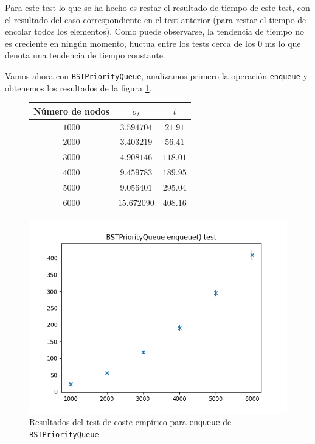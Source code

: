 \documentclass[a4paper, 12pt]{article}
\begin{document}
                Para este test lo que se ha hecho es restar el resultado de 
                tiempo de este test, con el resultado del caso correspondiente 
                en el test anterior (para restar el tiempo de encolar todos los
                elementos). Como puede observarse, la tendencia de tiempo 
                no es creciente en ningún momento, fluctua entre los tests cerca
                de los 0 ms lo que denota una tendencia de tiempo constante.
                \\\mbox{}

                Vamos ahora con \texttt{BSTPriorityQueue}, analizamos primero la 
                operación \texttt{enqueue} y obtenemos los resultados de la 
                figura \ref{f:enq_bst_test}.

                \begin{figure}[ht!]
                    \centering
                    \begin{tabular}{|c|c|c|}
                        \hline
                        \textbf{Número de nodos} & \textbf{$\sigma_t$}  & \textbf{$t$} \\\hline
                        $1000$                   & $3.594704$           & $21.91$        \\\hline
                        $2000$                   & $3.403219$           & $56.41$        \\\hline
                        $3000$                   & $4.908146$           & $118.01$       \\\hline
                        $4000$                   & $9.459783$           & $189.95$       \\\hline
                        $5000$                   & $9.056401$           & $295.04$        \\\hline
                        $6000$                   & $15.672090$          & $408.16$       \\\hline                  
                    \end{tabular}
                    \includegraphics[]{img/costemp_bst_enq.png}
                    \caption{Resultados del test de coste empírico para 
                    \texttt{enqueue} de \texttt{BSTPriorityQueue}}
                    \label{f:enq_bst_test}
                \end{figure}
\end{document}
